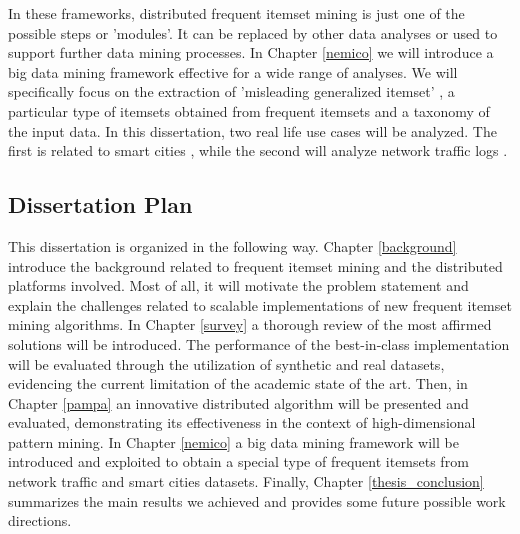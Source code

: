 In these frameworks, distributed frequent itemset mining is just one of the possible steps or 'modules'. It can be replaced by other data analyses or used to support further data mining processes. In Chapter \ref{nemico} we will introduce a big data mining framework effective for a wide range of analyses. We will specifically focus on the extraction of 'misleading generalized itemset' \cite{6924449}, a particular type of itemsets obtained from frequent itemsets and a taxonomy of the input data. In this dissertation, two real life use cases will be analyzed. The first is related to smart cities \cite{6924449},\cite{DBLP:conf/sebd/BaralisCCCGPG14} while the second will analyze network traffic logs \cite{apiletti20143}.

\subsection{Dissertation Plan}
This dissertation is organized in the following way. Chapter \ref{background} introduce the background related to frequent itemset mining and the distributed platforms involved. Most of all, it will motivate the problem statement and explain the challenges related to scalable implementations of new frequent itemset mining algorithms.
In Chapter \ref{survey} a thorough review of the most affirmed solutions will be introduced. The performance of the best-in-class implementation will be evaluated through the utilization of synthetic and real datasets, evidencing the current limitation of the academic state of the art.
Then, in Chapter \ref{pampa} an innovative distributed algorithm will be presented and evaluated, demonstrating its effectiveness in the context of high-dimensional pattern mining.
In Chapter \ref{nemico} a big data mining framework will be introduced and exploited to obtain a special type of frequent itemsets from network traffic and smart cities datasets.
Finally, Chapter \ref{thesis_conclusion} summarizes the main results we achieved and provides some future possible work directions. 



